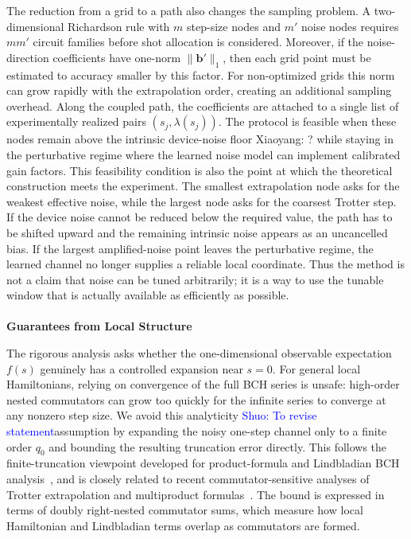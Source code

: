 \documentclass[aps,pra,reprint,superscriptaddress]{revtex4-2}
\newcommand{\sz}[1]{\textcolor{blue}{Shuo: #1}}
\newcommand{\wxy}[1]{{\color{red} Xiaoyang: #1}}
\begin{document}
The reduction from a grid to a path also changes the sampling problem.
A two-dimensional Richardson rule with $m$ step-size nodes and $m'$ noise nodes requires $mm'$ circuit families before shot allocation is considered.
Moreover, if the noise-direction coefficients have one-norm $\|\mathbf b'\|_1$, then each grid point must be estimated to accuracy smaller by this factor.
For non-optimized grids this norm can grow rapidly with the extrapolation order, creating an additional sampling overhead.
Along the coupled path, the coefficients are attached to a single list of experimentally realized pairs $(s_j,\lambda(s_j))$.
The protocol is feasible when these nodes remain above the intrinsic device-noise floor\wxy{?} while staying in the perturbative regime where the learned noise model can implement calibrated gain factors.
This feasibility condition is also the point at which the theoretical construction meets the experiment.
The smallest extrapolation node asks for the weakest effective noise, while the largest node asks for the coarsest Trotter step.
If the device noise cannot be reduced below the required value, the path has to be shifted upward and the remaining intrinsic noise appears as an uncancelled bias.
If the largest amplified-noise point leaves the perturbative regime, the learned channel no longer supplies a reliable local coordinate.
Thus the method is not a claim that noise can be tuned arbitrarily; it is a way to use the tunable window that is actually available as efficiently as possible.
\\\\
\textbf{Guarantees from Local Structure}

\noindent The rigorous analysis asks whether the one-dimensional observable expectation $f(s)$ genuinely has a controlled expansion near $s=0$.
For general local Hamiltonians, relying on convergence of the full BCH series is unsafe: high-order nested commutators can grow too quickly for the infinite series to converge at any nonzero step size.
We avoid this analyticity \sz{To revise statement}assumption by expanding the noisy one-step channel only to a finite order $q_0$ and bounding the resulting truncation error directly.
This follows the finite-truncation viewpoint developed for product-formula and Lindbladian BCH analysis~\cite{childs2021theory,aftab2024multi,wang2026lindbladiansimulationcommutatorbounds}, and is closely related to recent commutator-sensitive analyses of Trotter extrapolation and multiproduct formulas~\cite{watson2025exponentially,mizuta2025commutator}.
The bound is expressed in terms of doubly right-nested commutator sums, which measure how local Hamiltonian and Lindbladian terms overlap as commutators are formed.
\end{document}
